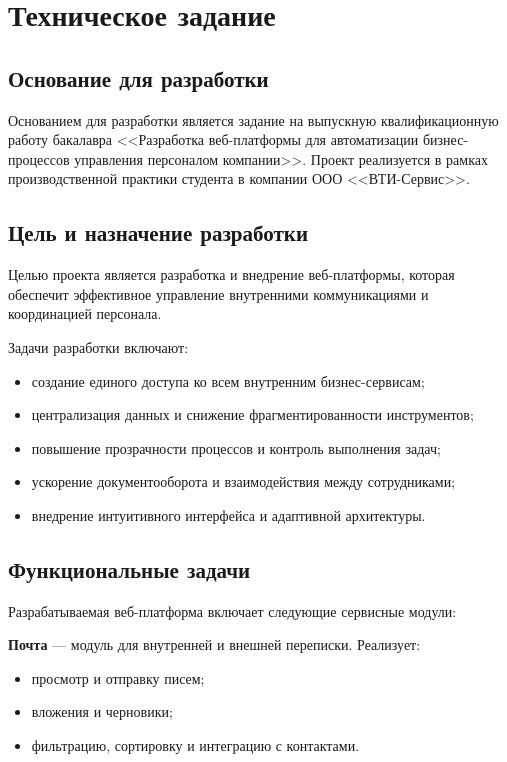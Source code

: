 \section{Техническое задание}

\subsection{Основание для разработки}

Основанием для разработки является задание на выпускную квалификационную работу бакалавра <<Разработка веб-платформы для автоматизации бизнес-процессов управления персоналом компании>>. Проект реализуется в рамках производственной практики студента в компании ООО <<ВТИ-Сервис>>.

\subsection{Цель и назначение разработки}

Целью проекта является разработка и внедрение веб-платформы, которая обеспечит эффективное управление внутренними коммуникациями и координацией персонала.

Задачи разработки включают:

\begin{itemize}
  \item создание единого доступа ко всем внутренним бизнес-сервисам;
  \item централизация данных и снижение фрагментированности инструментов;
  \item повышение прозрачности процессов и контроль выполнения задач;
  \item ускорение документооборота и взаимодействия между сотрудниками;
  \item внедрение интуитивного интерфейса и адаптивной архитектуры.
\end{itemize}

\subsection{Функциональные задачи}

Разрабатываемая веб-платформа включает следующие сервисные модули:

  \textbf{Почта} — модуль для внутренней и внешней переписки. Реализует:
  \begin{itemize}
    \item просмотр и отправку писем;
    \item вложения и черновики;
    \item фильтрацию, сортировку и интеграцию с контактами.
  \end{itemize}

